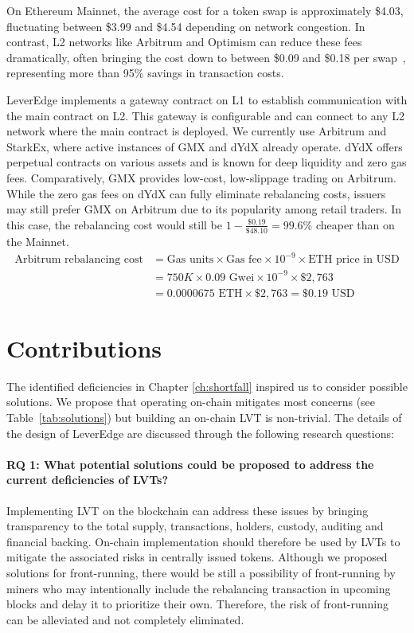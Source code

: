 \begin{example}
	On Ethereum Mainnet, the average cost for a token swap is approximately \$4.03, fluctuating between \$3.99 and \$4.54 depending on network congestion. In contrast, L2 networks like Arbitrum and Optimism can reduce these fees dramatically, often bringing the cost down to between \$0.09 and \$0.18 per swap~\cite{dailycoin2024}, representing more than 95\% savings in transaction costs.
\end{example}

LeverEdge implements a gateway contract on L1 to establish communication with the main contract on L2. This gateway is configurable and can connect to any L2 network where the main contract is deployed. We currently use Arbitrum and StarkEx, where active instances of GMX and dYdX already operate. dYdX offers perpetual contracts on various assets and is known for deep liquidity and zero gas fees. Comparatively, GMX provides low-cost, low-slippage trading on Arbitrum. While the zero gas fees on dYdX can fully eliminate rebalancing costs, issuers may still prefer GMX on Arbitrum due to its popularity among retail traders. In this case, the rebalancing cost would still be \(1-\frac{\$0.19}{\$48.10}=99.6\%\) cheaper than on the Mainnet.
\begin{equation*}
	\begin{aligned}
		\text{Arbitrum rebalancing cost} & = \text{Gas units} \times \text{Gas fee} \times 10^{-9} \times \text{ETH price in USD} \\
		& = 750K \times 0.09 \text{ Gwei} \times 10^{-9} \times \$2,763 \\
		& = 0.0000675 \text{ ETH} \times \$2,763 = \$0.19 \text{ USD}
	\end{aligned}
\end{equation*}

\section{Contributions}
The identified deficiencies in Chapter \ref{ch:shortfall} inspired us to consider possible solutions. We propose that operating on-chain mitigates most concerns (see Table~\ref{tab:solutions}) but building an on-chain LVT is non-trivial. The details of the design of LeverEdge are discussed through the following research questions:

\paragraph{RQ 1: What potential solutions could be proposed to address the current deficiencies of LVTs?} Implementing LVT on the blockchain can address these issues by bringing transparency to the total supply, transactions, holders, custody, auditing and financial backing. On-chain implementation should therefore be used by LVTs to mitigate the associated risks in centrally issued tokens. Although we proposed solutions for front-running, there would be still a possibility of front-running by miners who may intentionally include the rebalancing transaction in upcoming blocks and delay it to prioritize their own. Therefore, the risk of front-running can be alleviated and not completely eliminated. 

